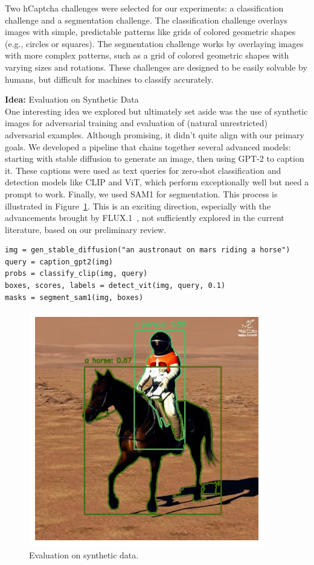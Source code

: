 \documentclass[a4paper, oneside]{discothesis}
\begin{document}
Two hCaptcha challenges were selected for our experiments: a classification challenge and a segmentation challenge. The classification challenge overlays images with simple, predictable patterns like grids of colored geometric shapes (e.g., circles or squares). The segmentation challenge works by overlaying images with more complex patterns, such as a grid of colored geometric shapes with varying sizes and rotations. These challenges are designed to be easily solvable by humans, but difficult for machines to classify accurately.

\begin{highlightbox}
	\textbf{Idea:} Evaluation on Synthetic Data \\

	One interesting idea we explored but ultimately set aside was the use of synthetic images for adversarial training and evaluation of (natural unrestricted) adversarial examples. Although promising, it didn't quite align with our primary goals. We developed a pipeline that chains together several advanced models: starting with stable diffusion to generate an image, then using GPT-2 to caption it. These captions were used as text queries for zero-shot classification and detection models like CLIP and ViT, which perform exceptionally well but need a prompt to work. Finally, we used SAM1 for segmentation. This process is illustrated in Figure~\ref{fig:chained}. This is an exciting direction, especially with the advancements brought by FLUX.1~\cite{BlackForestLabs2024FLUX}, not sufficiently explored in the current literature, based on our preliminary review. \\

\begin{verbatim}
img = gen_stable_diffusion("an austronaut on mars riding a horse")
query = caption_gpt2(img)
probs = classify_clip(img, query)
boxes, scores, labels = detect_vit(img, query, 0.1)
masks = segment_sam1(img, boxes)
\end{verbatim}
\end{highlightbox}

\begin{figure}
	\centering
	\includegraphics[width=0.3\columnwidth]{figures/chained.png}
	\caption{Evaluation on synthetic data.}
	\label{fig:chained}
\end{figure}
\end{document}

